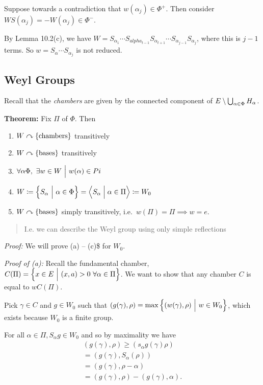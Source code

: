 Suppose towards a contradiction that \(w(\alpha_j) \in \Phi^+\). Then
consider \(WS(\alpha_j) = -W(\alpha_j) \in \Phi^-\).

By Lemma 10.2(c), we have
\(W = S_{\alpha_1} \cdots S_{alpha_{t-1}} S_{\alpha_{t+1}} \cdots S_{\alpha_{j-1}} S_{\alpha_j}\),
where this is \(j-1\) terms. So \(w = S_\alpha \cdots S_{\alpha_j}\) is
not reduced.

\hypertarget{weyl-groups}{%
\subsection{Weyl Groups}\label{weyl-groups}}

Recall that the \emph{chambers} are given by the connected component of
\(E \setminus \bigcup_{\alpha\in\Phi} H_\alpha\).

\textbf{Theorem:} Fix \(\Pi\) of \(\Phi\). Then

\begin{enumerate}
\def\labelenumi{\alph{enumi}.}
\tightlist
\item
  \(W \curvearrowright\left\{{\text{chambers}}\right\}\) transitively
\item
  \(W \curvearrowright\left\{{\text{bases}}\right\}\) transitively
\item
  \(\forall \alpha \Phi, ~\exists w\in W {~\mathrel{\Big|}~} w(\alpha) \in Pi\)
\item
  \(W \coloneqq \left\{{S_\alpha {~\mathrel{\Big|}~} \alpha\in\Phi}\right\} = \left\langle{S_\alpha \mathrel{\Big|}\alpha \in \Pi}\right\rangle \coloneqq W_0\)
\item
  \(W \curvearrowright \left\{{\text{bases}}\right\}\) simply transitively,
  i.e.~\(w(\Pi) = \Pi \implies w = e\).
\end{enumerate}

\begin{quote}
I.e. we can describe the Weyl group using only simple reflections
\end{quote}

\emph{Proof:} We will prove (a) -- (c)\$ for \(W_0\).

\emph{Proof of (a):} Recall the fundamental chamber,
\(C(\Pi) = \left\{{x\in E {~\mathrel{\Big|}~} (x, a) > 0 ~\forall \alpha\in\Pi}\right\}\).
We want to show that any chamber \(C\) is equal to \(wC(\Pi)\).

Pick \(\gamma \in C\) and \(g\in W_0\) such that
\((g(\gamma), \rho) = \max\left\{{(w(\gamma), \rho) {~\mathrel{\Big|}~} w\in W_0}\right\}\),
which exists because \(W_0\) is a finite group.

For all \(\alpha \in \Pi, S_\alpha g \in W_0\) and so by maximality we
have \begin{align*}
(g(\gamma), \rho) 
\geq (s_\alpha g(\gamma) \rho) \\
= (g(\gamma), S_\alpha(\rho)) \\
= (g(\gamma), \rho - \alpha) \\
= (g(\gamma), \rho) - (g(\gamma), \alpha)
.\end{align*}


